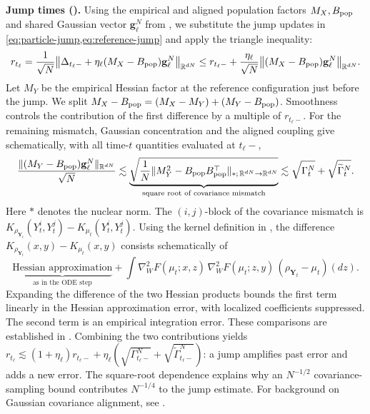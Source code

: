 \noindent
\textbf{Jump times ().}
Using the empirical and aligned population factors \(M_X,B_{\rm pop}\)
and shared Gaussian vector \(\mathbf g_\ell^N\) from
, we substitute the jump updates in
\cref{eq:particle-jump,eq:reference-jump} and apply the triangle inequality:
\[
 r_{t_\ell}
 =\frac1{\sqrt N}\bigl\|\Delta_{t_\ell-}
 +\eta_\ell(M_X-B_{\rm pop})\mathbf g_\ell^N\bigr\|_{\mathbb R^{dN}}
 \le r_{t_\ell-}
 +\frac{\eta_\ell}{\sqrt N}
 \bigl\|(M_X-B_{\rm pop})\mathbf g_\ell^N\bigr\|_{\mathbb R^{dN}}.
\]
Let \(M_Y\) be the empirical Hessian factor at the reference configuration
just before the jump. We split
\(M_X-B_{\rm pop}=(M_X-M_Y)+(M_Y-B_{\rm pop})\).
Smoothness controls the contribution of the first difference by a multiple
of \(r_{t_\ell-}\). For the remaining mismatch, Gaussian concentration and
the aligned coupling give schematically, with all time-\(t\) quantities
evaluated at \(t_\ell-\),
\[
 \frac{\|(M_Y-B_{\rm pop})\mathbf g_\ell^N\|_{\mathbb R^{dN}}}{\sqrt N}
 \lesssim
 \underbrace{
 \sqrt{\frac1N
 \|M_Y^2-B_{\rm pop}B_{\rm pop}^{\top}\|_{*;\,\mathbb R^{dN}\to\mathbb R^{dN}}}
 }_{\text{square root of covariance mismatch}}
 \lesssim \sqrt{\Gamma_t^N}+\sqrt{\widetilde\Gamma_t^N}.
\]
Here \(*\) denotes the nuclear norm. The \((i,j)\)-block of the covariance
mismatch is \(K_{\rho_{\mathbf Y_t}}(Y_t^i,Y_t^j)-K_{\mu_t}(Y_t^i,Y_t^j)\).
Using the kernel definition in , the difference
\(K_{\rho_{\mathbf Y_t}}(x,y)-K_{\mu_t}(x,y)\) consists schematically of
\[
 \underbrace{\text{Hessian approximation}}_{\text{as in the ODE step}}
 +\int\nabla_W^2F(\mu_t;x,z)\,
 \nabla_W^2F(\mu_t;z,y)\,
 (\rho_{\mathbf Y_t}-\mu_t)(dz).
\]
Expanding the difference of the two Hessian products bounds the first term
linearly in the Hessian approximation error, with localized coefficients suppressed.
The second term is an empirical integration error.
These comparisons are established in
.
Combining the two contributions yields
\(r_{t_\ell}\lesssim(1+\eta_\ell)r_{t_\ell-}
+\eta_\ell(\sqrt{\Gamma_{t_\ell-}^N}+\sqrt{\widetilde\Gamma_{t_\ell-}^N})\):
a jump amplifies past error and adds a new error.
The square-root dependence explains why an \(N^{-1/2}\) covariance-sampling
bound contributes \(N^{-1/4}\) to the jump estimate.
For background on Gaussian covariance alignment, see \citet{masarotto2019procrustes}.

